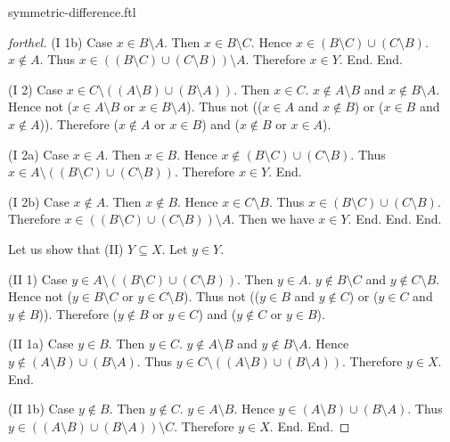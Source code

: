 \documentclass{naproche-library}
\begin{document}
\begin{smodule}{symmetric-difference.ftl}
\begin{proof}[forthel]
        (I 1b) Case $x \in B \setminus A$.
          Then $x \in B \setminus C$.
          Hence $x \in (B \setminus C) \cup (C \setminus B)$. $x \notin A$.
          Thus $x \in ((B \setminus C) \cup (C \setminus B)) \setminus A$.
          Therefore $x \in Y$.
        End.
      End.

      (I 2) Case $x \in C \setminus ((A \setminus B) \cup (B \setminus A))$.
        Then $x \in C$.
        $x \notin A \setminus B$ and $x \notin B \setminus A$.
        Hence not ($x \in A \setminus B$ or $x \in B \setminus A$).
        Thus not (($x \in A$ and $x \notin B$) or ($x \in B$ and $x \notin A$)).
        Therefore ($x \notin A$ or $x \in B$) and ($x \notin B$ or $x \in A$).

        (I 2a) Case $x \in A$.
          Then $x \in B$.
          Hence $x \notin (B \setminus C) \cup (C \setminus B)$.
          Thus $x \in A \setminus ((B \setminus C) \cup (C \setminus B))$.
          Therefore $x \in Y$.
        End.

        (I 2b) Case $x \notin A$.
          Then $x \notin B$.
          Hence $x \in C \setminus B$.
          Thus $x \in (B \setminus C) \cup (C \setminus B)$.
          Therefore $x \in ((B \setminus C) \cup (C \setminus B)) \setminus A$.
          Then we have $x \in Y$.
        End.
      End.
    End.

    Let us show that (II) $Y \subseteq X$.
      Let $y \in Y$.

      (II 1) Case $y \in A \setminus ((B \setminus C) \cup (C \setminus B))$.
        Then $y \in A$.
        $y \notin B \setminus C$ and $y \notin C \setminus B$.
        Hence not ($y \in B \setminus C$ or $y \in C \setminus B$).
        Thus not (($y \in B$ and $y \notin C$) or ($y \in C$ and $y \notin B$)).
        Therefore ($y \notin B$ or $y \in C$) and ($y \notin C$ or $y \in B$).

        (II 1a) Case $y \in B$.
          Then $y \in C$.
          $y \notin A \setminus B$ and $y \notin B \setminus A$.
          Hence $y \notin (A \setminus B) \cup (B \setminus A)$.
          Thus $y \in C \setminus ((A \setminus B) \cup (B \setminus A))$.
          Therefore $y \in X$.
        End.

        (II 1b) Case $y \notin B$.
          Then $y \notin C$.
          $y \in A \setminus B$.
          Hence $y \in (A \setminus B) \cup (B \setminus A)$.
          Thus $y \in ((A \setminus B) \cup (B \setminus A)) \setminus C$.
          Therefore $y \in X$.
        End.
      End.


\end{proof}
\end{smodule}
\end{document}
